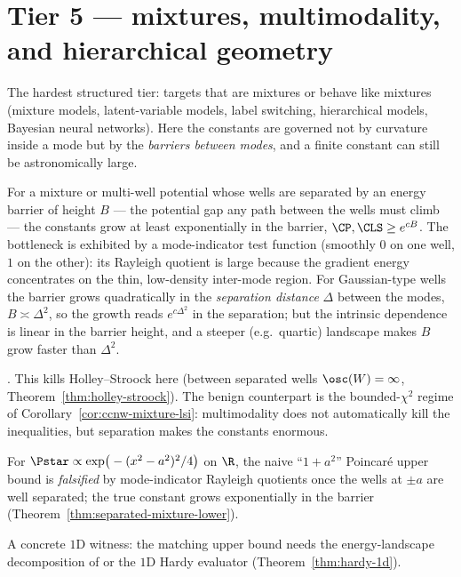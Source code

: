 \documentclass[../main.tex]{subfiles}
\begin{document}
\section{Tier 5 --- mixtures, multimodality, and hierarchical geometry}
\label{sec:tier5}

The hardest structured tier: targets that are mixtures or behave like mixtures (mixture
models, latent-variable models, label switching, hierarchical models, Bayesian neural
networks). Here the constants are governed not by curvature inside a mode but by the
\emph{barriers between modes}, and a finite constant can still be astronomically large.

\begin{theorem}
\label{thm:separated-mixture-lower}
For a mixture or multi-well potential whose wells are separated by an energy barrier of height
$B$ --- the potential gap any path between the wells must climb --- the constants grow at least
exponentially in the barrier, $\CP,\CLS\ge e^{cB}$. The bottleneck is exhibited by a
mode-indicator test function (smoothly $0$ on one well, $1$ on the other): its Rayleigh
quotient is large because the gradient energy concentrates on the thin, low-density inter-mode
region. For Gaussian-type wells the barrier grows quadratically in the \emph{separation
distance} $\Delta$ between the modes, $B\asymp\Delta^2$, so the growth reads $e^{c\Delta^2}$ in
the separation; but the intrinsic dependence is linear in the barrier height, and a steeper
(e.g.\ quartic) landscape makes $B$ grow faster than $\Delta^2$.
\end{theorem}
\noindent\cite{BakryGentilLedoux2014,MenzSchlichting2014}. This kills Holley--Stroock here
(between separated wells $\osc(W)=\infty$, Theorem~\ref{thm:holley-stroock}). The benign
counterpart is the bounded-$\chi^2$ regime of Corollary~\ref{cor:ccnw-mixture-lsi}:
multimodality does not automatically kill the inequalities, but separation makes the
constants enormous.

\begin{family}
\label{fam:double-well-1d}
For $\Pstar\propto\exp\!\big(-(x^2-a^2)^2/4\big)$ on $\R$, the naive ``$1+a^2$'' Poincar\'e
upper bound is \emph{falsified} by mode-indicator Rayleigh quotients once the wells at $\pm a$
are well separated; the true constant grows exponentially in the barrier
(Theorem~\ref{thm:separated-mixture-lower}).
\end{family}
\noindent A concrete $1$D witness: the matching upper bound needs the energy-landscape
decomposition of \cite{MenzSchlichting2014} or the $1$D Hardy evaluator
(Theorem~\ref{thm:hardy-1d}).
\end{document}

